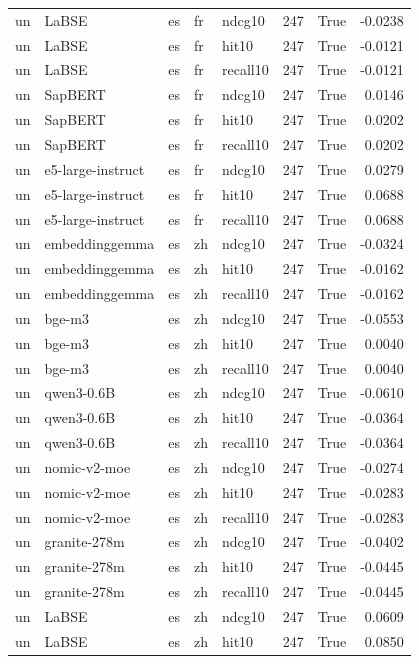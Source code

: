 \begin{tabular}{lllllrrr}
un & LaBSE & es & fr & ndcg10 & 247 & True & -0.0238 \\
un & LaBSE & es & fr & hit10 & 247 & True & -0.0121 \\
un & LaBSE & es & fr & recall10 & 247 & True & -0.0121 \\
un & SapBERT & es & fr & ndcg10 & 247 & True & 0.0146 \\
un & SapBERT & es & fr & hit10 & 247 & True & 0.0202 \\
un & SapBERT & es & fr & recall10 & 247 & True & 0.0202 \\
un & e5-large-instruct & es & fr & ndcg10 & 247 & True & 0.0279 \\
un & e5-large-instruct & es & fr & hit10 & 247 & True & 0.0688 \\
un & e5-large-instruct & es & fr & recall10 & 247 & True & 0.0688 \\
un & embeddinggemma & es & zh & ndcg10 & 247 & True & -0.0324 \\
un & embeddinggemma & es & zh & hit10 & 247 & True & -0.0162 \\
un & embeddinggemma & es & zh & recall10 & 247 & True & -0.0162 \\
un & bge-m3 & es & zh & ndcg10 & 247 & True & -0.0553 \\
un & bge-m3 & es & zh & hit10 & 247 & True & 0.0040 \\
un & bge-m3 & es & zh & recall10 & 247 & True & 0.0040 \\
un & qwen3-0.6B & es & zh & ndcg10 & 247 & True & -0.0610 \\
un & qwen3-0.6B & es & zh & hit10 & 247 & True & -0.0364 \\
un & qwen3-0.6B & es & zh & recall10 & 247 & True & -0.0364 \\
un & nomic-v2-moe & es & zh & ndcg10 & 247 & True & -0.0274 \\
un & nomic-v2-moe & es & zh & hit10 & 247 & True & -0.0283 \\
un & nomic-v2-moe & es & zh & recall10 & 247 & True & -0.0283 \\
un & granite-278m & es & zh & ndcg10 & 247 & True & -0.0402 \\
un & granite-278m & es & zh & hit10 & 247 & True & -0.0445 \\
un & granite-278m & es & zh & recall10 & 247 & True & -0.0445 \\
un & LaBSE & es & zh & ndcg10 & 247 & True & 0.0609 \\
un & LaBSE & es & zh & hit10 & 247 & True & 0.0850 \\

\end{tabular}
